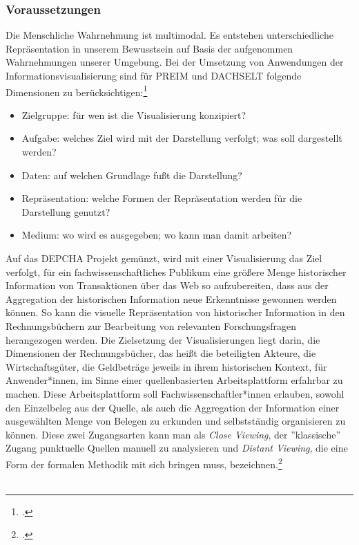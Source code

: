 \documentclass[12pt,a4paper]{article}
\begin{document}
\subsubsection{Voraussetzungen}

Die Menschliche Wahrnehmung ist multimodal. Es entstehen unterschiedliche Repräsentation in unserem Bewusstsein auf Basis der aufgenommen Wahrnehmungen unserer Umgebung. Bei der Umsetzung von Anwendungen der Informationsvisualisierung sind für PREIM und DACHSELT folgende Dimensionen zu berücksichtigen:\footcite[][S.437-440]{preim2010interaktive}
\begin{itemize}
    \item Zielgruppe: für wen ist die Visualisierung konzipiert?
    \item Aufgabe: welches Ziel wird mit der Darstellung verfolgt; was soll dargestellt werden?
    \item Daten: auf welchen Grundlage fußt die Darstellung?
    \item Repräsentation: welche Formen der Repräsentation werden für die Darstellung genutzt?
    \item Medium: wo wird es ausgegeben; wo kann man damit arbeiten?
\end{itemize}
Auf das DEPCHA Projekt gemünzt, wird mit einer Visualisierung das Ziel verfolgt, für ein fachwissenschaftliches Publikum eine größere Menge historischer Information von Transaktionen über das Web so aufzubereiten,  dass aus der Aggregation der historischen Information neue Erkenntnisse gewonnen werden können. So kann die visuelle Repräsentation von historischer Information in den Rechnungsbüchern zur Bearbeitung von relevanten Forschungsfragen herangezogen werden. Die Zielsetzung der Visualisierungen liegt darin, die Dimensionen der Rechnungsbücher, das heißt die beteiligten Akteure, die Wirtschaftsgüter, die Geldbeträge jeweils in ihrem historischen Kontext, für Anwender*innen, im Sinne einer quellenbasierten Arbeitsplattform erfahrbar zu machen. Diese Arbeitsplattform soll Fachwissenschaftler*innen erlauben, sowohl den Einzelbeleg aus der Quelle, als auch die Aggregation der Information einer ausgewählten Menge von Belegen zu erkunden und selbstständig organisieren zu können. Diese zwei Zugangsarten kann man als \textit{Close Viewing}, der ''klassische'' Zugang punktuelle Quellen manuell zu analysieren und \textit{Distant Viewing}, die eine Form der formalen Methodik mit sich bringen muss, bezeichnen.\footcite[][]{hsozkult2014closereading} 
\\
\\
\end{document}
